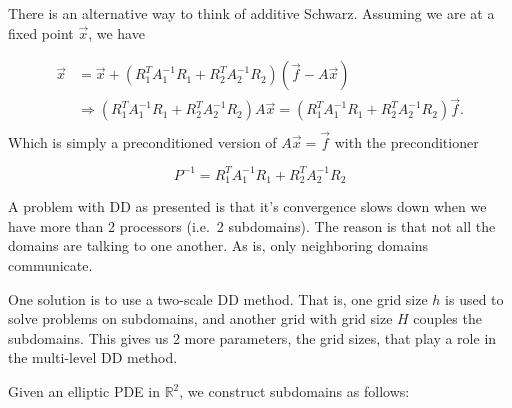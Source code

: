 There is an alternative way to think of additive Schwarz. Assuming we are at a fixed point $\vec{x}$, we have 


\begin{align*}
    \vec{x} &= \vec{x}+
    \left(R_1^T A_1^{-1} R_1 + R_2^T A_2^{-1} R_2\right)
    \left(\vec{f} - A\vec{x}\right)\\
    &\Rightarrow\left(R_1^T A_1^{-1} R_1 + R_2^T A_2^{-1} R_2\right)
    A\vec{x} = \left(R_1^T A_1^{-1} R_1 + R_2^T A_2^{-1} R_2\right)\vec{f}.\\
\end{align*}
Which is simply a preconditioned version of $A\vec{x} = \vec{f}$ with the preconditioner

\begin{equation*}
    P^{-1} = R_1^T A_1^{-1} R_1 + R_2^T A_2^{-1} R_2
\end{equation*}


A problem with DD as presented is that it's convergence slows down when we have more than 2 processors (i.e.\ 2 subdomains). The reason is that not all the domains are talking to one another. As is, only neighboring domains communicate.

One solution is to use a two-scale DD method. That is, one grid size $h$ is used to solve problems on subdomains, and another grid with grid size $H$ couples the subdomains. This gives us 2 more parameters, the grid sizes, that play a role in the multi-level DD method.

Given an elliptic PDE in $\mathbb{R}^2$, we construct subdomains as follows:

\begin{center}
\end{center}

